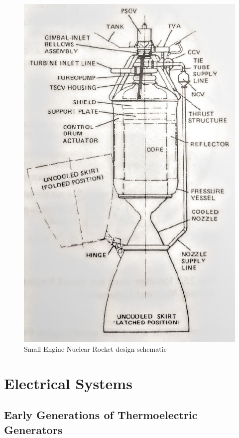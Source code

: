 \documentclass{article}
\begin{document}
\begin{figure}[H]
	\centering
	\includegraphics[height=0.45\textheight]{fig/appZ}
	\caption[Small Engine Nuclear Rocket design schematic]{Small Engine Nuclear Rocket design schematic~\cite{durham1972nuclear}}
	\label{appZ}
\end{figure}



\section{Electrical Systems}

\subsection{Early Generations of Thermoelectric Generators}
\end{document}
